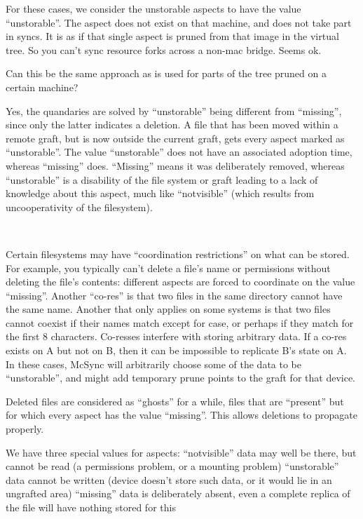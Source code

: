 \documentclass{book}
\begin{document}
For these cases, we consider the unstorable aspects to have the value ``unstorable''.
The aspect does not exist on that machine, and does not take part in syncs.
It is as if that single aspect is pruned from that image in the virtual tree.
So you can't sync resource forks across a non-mac bridge.  Seems ok.

Can this be the same approach as is used for parts of the tree pruned on a certain machine?

Yes, the quandaries are solved by ``unstorable'' being different from ``missing'', since only the latter indicates a deletion.  A file that has been moved within a remote graft, but is now outside the current graft, gets every aspect marked as ``unstorable''.
The value ``unstorable'' does not have an associated adoption time, whereas ``missing'' does.  ``Missing'' means it was deliberately removed, whereas ``unstorable'' is a disability of the file system or graft leading to a lack of knowledge about this aspect, much like ``notvisible'' (which results from uncooperativity of the filesystem).

~

Certain filesystems may have ``coordination restrictions'' on what can be stored.  For example, you typically can't delete a file's name or permissions without deleting the file's contents: different aspects are forced to coordinate on the value ``missing''.  Another ``co-res'' is that two files in the same directory cannot have the same name.  Another that only applies on some systems is that two files cannot coexist if their names match except for case, or perhaps if they match for the first 8 characters.  Co-resses interfere with storing arbitrary data.  If a co-res exists on A but not on B, then it can be impossible to replicate B's state on A.  In these cases, McSync will arbitrarily choose some of the data to be ``unstorable'', and might add temporary prune points to the graft for that device.

Deleted files are considered as ``ghosts'' for a while, files that are ``present'' but for which every aspect has the value ``missing''.  This allows deletions to propagate properly.

We have three special values for aspects:
``notvisible''  data may well be there, but cannot be read (a permissions problem, or a mounting problem)
``unstorable''  data cannot be written (device doesn't store such data, or it would lie in an ungrafted area)
``missing''     data is deliberately absent, even a complete replica of the file will have nothing stored for this
\end{document}
